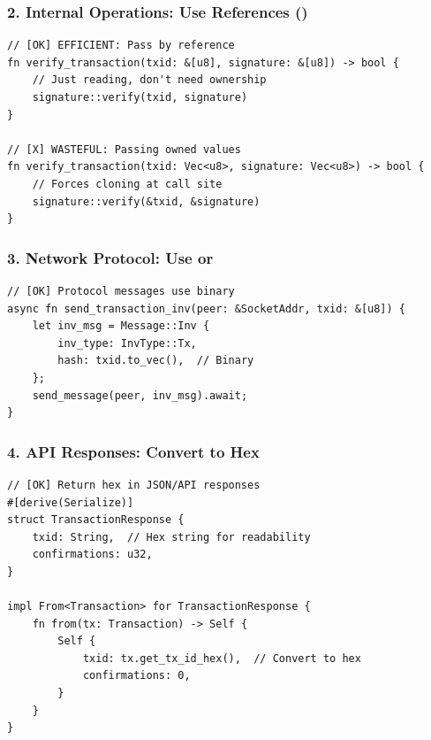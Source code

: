 \subsubsection{2. Internal Operations: Use References (\code{\&[u8]})}
\label{sec:ch06-internal-refs}

\begin{listing}[H]
\caption{Internal operation best practices}
\label{lst:ch06-21}
\begin{verbatim}
// [OK] EFFICIENT: Pass by reference
fn verify_transaction(txid: &[u8], signature: &[u8]) -> bool {
    // Just reading, don't need ownership
    signature::verify(txid, signature)
}

// [X] WASTEFUL: Passing owned values
fn verify_transaction(txid: Vec<u8>, signature: Vec<u8>) -> bool {
    // Forces cloning at call site
    signature::verify(&txid, &signature)
}
\end{verbatim}
\end{listing}

\subsubsection{3. Network Protocol: Use  or \code{\&[u8]}}
\label{sec:ch06-network-best-practice}

\begin{listing}[H]
\caption{Network protocol best practices}
\label{lst:ch06-22}
\begin{verbatim}
// [OK] Protocol messages use binary
async fn send_transaction_inv(peer: &SocketAddr, txid: &[u8]) {
    let inv_msg = Message::Inv {
        inv_type: InvType::Tx,
        hash: txid.to_vec(),  // Binary
    };
    send_message(peer, inv_msg).await;
}
\end{verbatim}
\end{listing}

\needspace{2in}
\subsubsection{4. API Responses: Convert to Hex}
\label{sec:ch06-api-responses}

\begin{listing}[H]
\caption{API response best practices}
\label{lst:ch06-23}
\begin{verbatim}
// [OK] Return hex in JSON/API responses
#[derive(Serialize)]
struct TransactionResponse {
    txid: String,  // Hex string for readability
    confirmations: u32,
}

impl From<Transaction> for TransactionResponse {
    fn from(tx: Transaction) -> Self {
        Self {
            txid: tx.get_tx_id_hex(),  // Convert to hex
            confirmations: 0,
        }
    }
}
\end{verbatim}
\end{listing}

